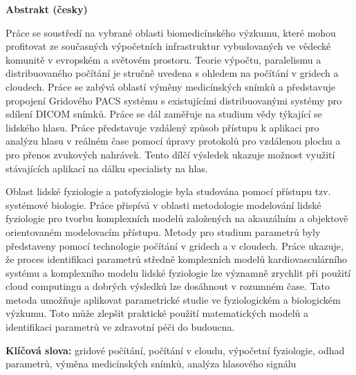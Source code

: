 
\newpage
\begin{center}
\Large \textbf{Abstrakt (česky)}
\end{center} 
\normalsize
Práce se soustředí na vybrané oblasti biomedicínského výzkumu, které mohou profitovat ze současných výpočetních infrastruktur vybudovaných ve vědecké komunitě v evropském a světovém prostoru. Teorie výpočtu, paralelismu a distribuovaného počítání je stručně uvedena s ohledem na počítání v gridech a cloudech. Práce se zabývá oblastí výměny medicínských snímků a představuje propojení Gridového PACS systému s existujícími distribuovanými systémy pro sdílení DICOM snímků. Práce se dál zaměřuje na studium vědy týkající se lidského hlasu. Práce představuje vzdálený způsob přístupu k aplikaci pro analýzu hlasu v reálném čase pomocí úpravy protokolů pro vzdálenou plochu a pro přenos zvukových nahrávek. Tento dílčí výsledek ukazuje možnost využití stávajících aplikací na dálku specialisty na hlas. 

Oblast lidské fyziologie a patofyziologie byla studována pomocí přístupu tzv. systémové biologie. Práce přispívá v oblasti metodologie modelování lidské fyziologie pro tvorbu komplexních modelů založených na akauzálním a objektově orientovaném modelovacím přístupu. Metody pro studium parametrů byly představeny pomocí technologie počítání v gridech a v cloudech. Práce ukazuje, že proces identifikaci parametrů středně komplexních modelů kardiovasculárního systému a komplexního modelu lidské fyziologie lze významně zrychlit při použití cloud computingu a dobrých výsledků lze dosáhnout v rozumném čase. Tato metoda umožňuje aplikovat parametrické studie ve fyziologickém a biologickém výzkumu. Toto může zlepšit praktické použití matematických modelů a identifikaci parametrů ve zdravotní péči do budoucna.


\textbf{Klíčová slova:}
gridové počítání, počítání v cloudu, výpočetní fyziologie, odhad parametrů, výměna medicínských snímků, analýza hlasového signálu

